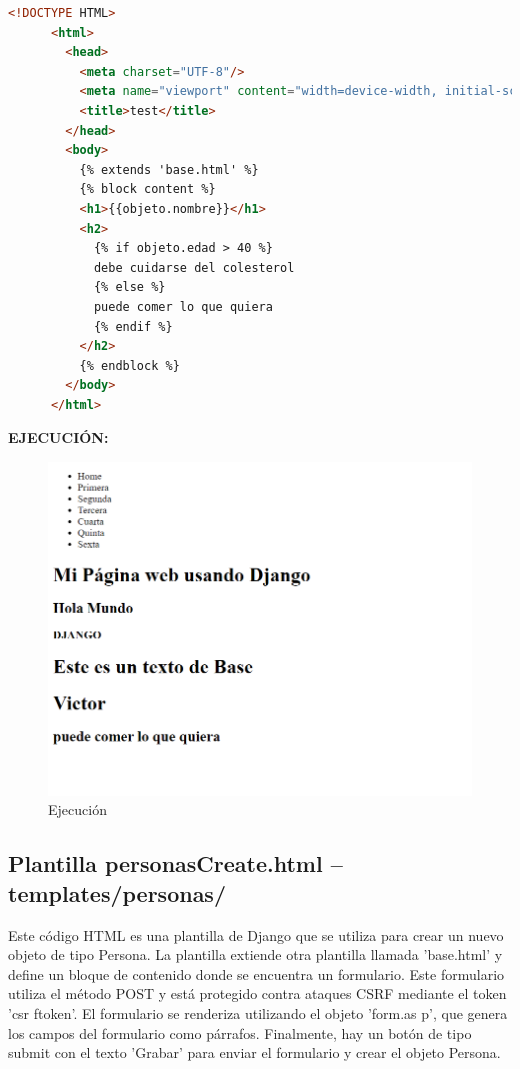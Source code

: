 \documentclass{article}
\begin{document}
    \begin{lstlisting}[language=html]
      <!DOCTYPE HTML>
      <html>
        <head>
          <meta charset="UTF-8"/>
          <meta name="viewport" content="width=device-width, initial-scale=1.0"/>
          <title>test</title>
        </head>
        <body>
          {% extends 'base.html' %}
          {% block content %}
          <h1>{{objeto.nombre}}</h1>
          <h2>
            {% if objeto.edad > 40 %}
            debe cuidarse del colesterol
            {% else %}
            puede comer lo que quiera
            {% endif %}
          </h2>
          {% endblock %}
        </body>
      </html>
    \end{lstlisting}
    \newpage
    \textbf{EJECUCIÓN: }
    \begin{figure}[H]
      \centering
      \includegraphics[width=1\textwidth, keepaspectratio]{img/ejecucion2.png}
      \caption{Ejecución}
    \end{figure}
  

  \subsection{Plantilla personasCreate.html -- templates/personas/}
    Este código HTML es una plantilla de Django que se utiliza para crear un nuevo objeto de tipo Persona. La plantilla extiende 
    otra plantilla llamada 'base.html' y define un bloque de contenido donde se encuentra un formulario. Este formulario utiliza 
    el método POST y está protegido contra ataques CSRF mediante el token 'csr ftoken'. El formulario se renderiza utilizando 
    el objeto 'form.as p', que genera los campos del formulario como párrafos. Finalmente, hay un botón de tipo submit con el texto 
    'Grabar' para enviar el formulario y crear el objeto Persona.
\end{document}
